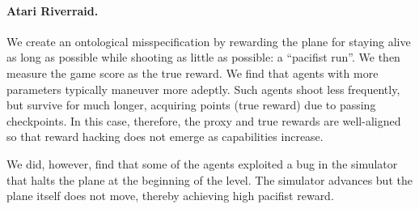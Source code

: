 \paragraph{Atari Riverraid.} %
We create an ontological misspecification by rewarding the plane for staying alive as long as possible while shooting as little as possible: a ``pacifist run''. We then measure the game score as the true reward.  %
We find that agents with more parameters typically maneuver more adeptly. Such agents shoot less frequently, but survive for much longer, acquiring points (true reward) due to passing checkpoints. In this case, therefore, the proxy and true rewards are well-aligned so that reward hacking does not emerge as capabilities increase. %

We did, however, find that some of the agents exploited a bug in the simulator that halts the plane at the beginning of the level. The simulator advances but the plane itself does not move, thereby achieving high pacifist reward. %



